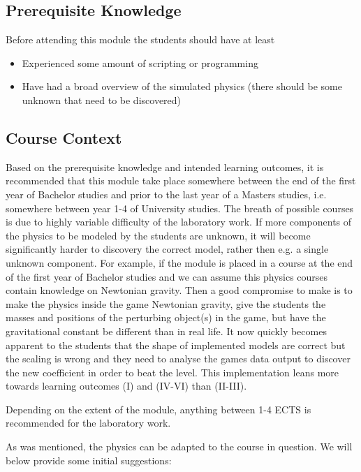 \documentclass[11pt, twocolumn]{article}
\begin{document}
\subsection{Prerequisite Knowledge}

Before attending this module the students should have at least

\begin{itemize}
    \item Experienced some amount of scripting or programming
    \item Have had a broad overview of the simulated physics (there should be some unknown that need to be discovered)
\end{itemize}

\subsection{Course Context}

Based on the prerequisite knowledge and intended learning outcomes, it is recommended that this module take place somewhere between the end of the first year of Bachelor studies and prior to the last year of a Masters studies, i.e. somewhere between year 1-4 of University studies. The breath of possible courses is due to highly variable difficulty of the laboratory work. If more components of the physics to be modeled by the students are unknown, it will become significantly harder to discovery the correct model, rather then e.g. a single unknown component. For example, if the module is placed in a course at the end of the first year of Bachelor studies and we can assume this physics courses contain knowledge on Newtonian gravity. Then a good compromise to make is to make the physics inside the game Newtonian gravity, give the students the masses and positions of the perturbing object(s) in the game, but have the gravitational constant be different than in real life. It now quickly becomes apparent to the students that the shape of implemented models are correct but the scaling is wrong and they need to analyse the games data output to discover the new coefficient in order to beat the level. This implementation leans more towards learning outcomes (I) and (IV-VI) than (II-III). 

Depending on the extent of the module, anything between 1-4 ECTS is recommended for the laboratory work.

As was mentioned, the physics can be adapted to the course in question. We will below provide some initial suggestions:
\end{document}
